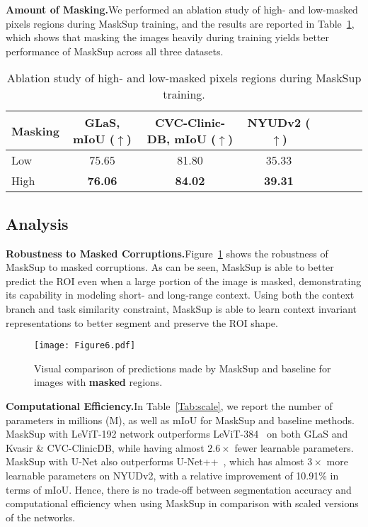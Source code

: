 \documentclass{bmvc2k}
\begin{document}
\medskip\noindent\textbf{Amount of Masking.}\quad We performed an ablation study of high- and low-masked pixels regions during MaskSup training, and the results are reported in Table~\ref{Tab:mask}, which shows that masking the images heavily during training yields better performance of MaskSup across all three datasets.

\begin{table}[!htb]
\caption{Ablation study of high- and low-masked pixels regions during MaskSup training.}
\medskip
\centering
\begin{tabular}{l*{7}{c}}
\toprule
\textbf{Masking} & \textbf{GLaS, mIoU ($\uparrow$)} & \textbf{CVC-Clinic-DB, mIoU ($\uparrow$)} & \textbf{NYUDv2 ($\uparrow$)} \\
\midrule
Low & 75.65 & 81.80 & 35.33 \\
High & \textbf{76.06} & \textbf{84.02} & \textbf{39.31} \\
\bottomrule
\end{tabular}
\label{Tab:mask}
\end{table}

\subsection{Analysis}
\noindent\textbf{Robustness to Masked Corruptions.}\quad Figure~\ref{Fig:qualmask} shows the robustness of MaskSup to masked corruptions. As can be seen, MaskSup is able to better predict the ROI even when a large portion of the image is masked, demonstrating its capability in modeling short- and long-range context. Using both the context branch and task similarity constraint, MaskSup is able to learn context invariant representations to better segment and preserve the ROI shape.

\begin{figure}[!htb]
\centering
\texttt{[image: Figure6.pdf]}
\caption{Visual comparison of predictions made by MaskSup and baseline for images with \textbf{masked} regions.}
\label{Fig:qualmask}
\end{figure}

\medskip\noindent\textbf{Computational Efficiency.}\quad In Table~\ref{Tab:scale}, we report the number of parameters in millions (M), as well as mIoU for MaskSup and baseline methods. MaskSup with LeViT-192 network outperforms LeViT-384~\cite{xu2021levit} on both GLaS and Kvasir \& CVC-ClinicDB, while having almost $2.6 \times$ fewer learnable parameters. MaskSup with U-Net also outperforms U-Net++~\cite{zhou2019unet++}, which has almost $3\times$ more learnable parameters on NYUDv2, with a relative improvement of 10.91\% in terms of mIoU. Hence, there is no trade-off between segmentation accuracy and computational efficiency when using MaskSup in comparison with scaled versions of the networks.
\end{document}
